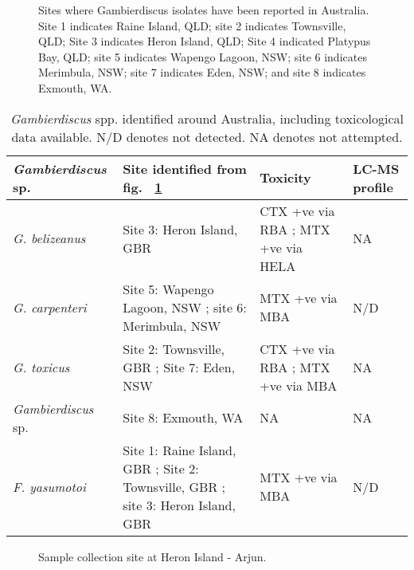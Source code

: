 \documentclass[12pt]{article}
\begin{document}
\FloatBarrier
\begin{figure} 
\caption{Sites where Gambierdiscus isolates have been reported in Australia. Site 1 indicates Raine Island, QLD; site 2 indicates Townsville, QLD; Site 3 indicates Heron Island, QLD; Site 4 indicated Platypus Bay, QLD; site 5 indicates Wapengo Lagoon, NSW; site 6 indicates Merimbula, NSW; site 7 indicates Eden, NSW; and site 8 indicates Exmouth, WA.​} 
\label{fig:OzSites}
\end{figure}
 \FloatBarrier
\begin{table}
\caption{\emph{Gambierdiscus} spp. identified around Australia, including toxicological data available. N/D denotes not detected. NA denotes not attempted.}
\label{tbl:OzTable}
\begin{tabular}{ | p{3.3cm} | p{4cm} | p{4.5cm} | p{2.3cm} | }
\hline
 \textbf{\emph{Gambierdiscus} sp.} & \textbf{Site identified from fig. ~\ref{fig:OzSites}} & \textbf{Toxicity}  & \textbf{LC-MS profile}  \\
 \hline
 \emph{G. belizeanus}  & Site 3: Heron Island, GBR \citep{murray2014molecular} & CTX +ve via RBA \citep{chinain2010growth}; MTX +ve via HELA \citep{holland2013differences} & NA  \\
 \hline
 \emph{G. carpenteri} &Site 5: Wapengo Lagoon, NSW \citep{kohli2014high}; site 6:  Merimbula, NSW  \citep{kohli2014high}& MTX +ve via MBA \citep{kohli2014high} & N/D \citep{kohli2014high}\\
 \hline
 \emph{G. toxicus} & Site 2: Townsville, GBR \citep{hallegraeff2010algae}; Site 7: Eden, NSW \citep{hallegraeff2010algae} & CTX +ve via RBA \citep{chinain2010growth}; MTX +ve via MBA \citep{chinain1999morphology} & NA \\
  \hline
  \emph{Gambierdiscus} sp. &Site 8: Exmouth, WA \citep{kohli2014cob}& NA & NA \\
  \hline
 \emph{F. yasumotoi}  & Site 1: Raine Island, GBR \citep{murray2014molecular}; Site 2: Townsville, GBR \citep{murray2014molecular}; site 3: Heron Island, GBR \citep{murray2014molecular}& MTX +ve via MBA \citep{holmes1998gambierdiscus} & N/D \citep{rhodes2014gambierdiscus}\\
  \hline
\end{tabular}
\end{table}

\FloatBarrier 
\begin{figure} 
\caption{Sample collection site at Heron Island - Arjun.} 
\label{fig:HeronMap}
\end{figure} 
\end{document}
